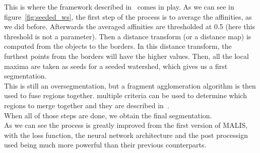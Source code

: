 This is where the framework described in~\cite{funke_large_2019} comes in play.
As we can see in figure~\ref{fig:seeded_ws}, the first step of the process is
to average the affinities, as we did before. Afterwards the averaged affinities
are thresholded at 0.5 (here this threshold is not a parameter). Then a
distance transform (or a distance map) is computed from the objects to the
borders. In this distance transform, the furthest points from the borders will
have the higher values. Then, all the local maxima are taken as seeds for a
seeded watershed, which gives us a first segmentation.\\

This is still an oversegmentation, but a fragment agglomeration algorithm is
then used to fuse regions together. multiple criteria can be used to
determine which regions to merge together and they are described
in~\cite{funke_large_2019}.\\
When all of those steps are done, we obtain the final segmentation.\\

As we can see the process is greatly improved from the first version of MALIS,
with the loss function, the neural network architecture and the post processign
used being much more powerful than their previous counterparts.
